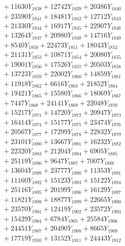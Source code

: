 \documentclass[a4paper,10pt]{article}
\begin{document}
{\begin{align}
&\;  + 11630 Y_{1838} + 12742 Y_{1839} + 20386 Y_{1840} \\[0.3ex]
&\;  + 23590 Y_{1841} + 18481 Y_{1842} + 12712 Y_{1843} \\[0.3ex]
&\;  + 21330 Y_{1844} + 16917 Y_{1845} + 22907 Y_{1846} \\[0.3ex]
&\;  + 13264 Y_{1847} + 20980 Y_{1848} + 14716 Y_{1849} \\[0.3ex]
&\;  + 8540 Y_{1850} + 22473 Y_{1851} + 18043 Y_{1852} \\[0.3ex]
&\;  + 21131 Y_{1853} + 10871 Y_{1854} + 20080 Y_{1855} \\[0.3ex]
&\;  + 19001 Y_{1856} + 17526 Y_{1857} + 20503 Y_{1858} \\[0.5ex]\allowbreak
&\;  + 13723 Y_{1859} + 22002 Y_{1860} + 14859 Y_{1861} \\[0.3ex]
&\;  + 11918 Y_{1862} + 6616 Y_{1863} + 21852 Y_{1864} \\[0.3ex]
&\;  + 19421 Y_{1865} + 15580 Y_{1866} + 18069 Y_{1867} \\[0.3ex]
&\;  + 7447 Y_{1868} + 24141 Y_{1869} + 22048 Y_{1870} \\[0.3ex]
&\;  + 15217 Y_{1871} + 14720 Y_{1872} + 20947 Y_{1873} \\[0.3ex]
&\;  + 16414 Y_{1874} + 15177 Y_{1875} + 23474 Y_{1876} \\[0.3ex]
&\;  + 20567 Y_{1877} + 17299 Y_{1878} + 22832 Y_{1879} \\[0.3ex]
&\;  + 23101 Y_{1880} + 13667 Y_{1881} + 16232 Y_{1882} \\[0.3ex]
&\;  + 22320 Y_{1883} + 21204 Y_{1884} + 6905 Y_{1885} \\[0.3ex]
&\;  + 25119 Y_{1886} + 9647 Y_{1887} + 7007 Y_{1888} \\[0.5ex]\allowbreak
&\;  + 13604 Y_{1889} + 23777 Y_{1890} + 11353 Y_{1891} \\[0.3ex]
&\;  + 11160 Y_{1892} + 15123 Y_{1893} + 15122 Y_{1894} \\[0.3ex]
&\;  + 25116 Y_{1895} + 20199 Y_{1896} + 16129 Y_{1897} \\[0.3ex]
&\;  + 11821 Y_{1898} + 18877 Y_{1899} + 22665 Y_{1900} \\[0.3ex]
&\;  + 23570 Y_{1901} + 12419 Y_{1902} + 23572 Y_{1903} \\[0.3ex]
&\;  + 15429 Y_{1904} + 6784 Y_{1905} + 25584 Y_{1906} \\[0.3ex]
&\;  + 24451 Y_{1907} + 20490 Y_{1908} + 8665 Y_{1909} \\[0.3ex]
&\;  + 17719 Y_{1910} + 13152 Y_{1911} + 24443 Y_{1912} \\[0.3ex]

\end{align}}
\end{document}
